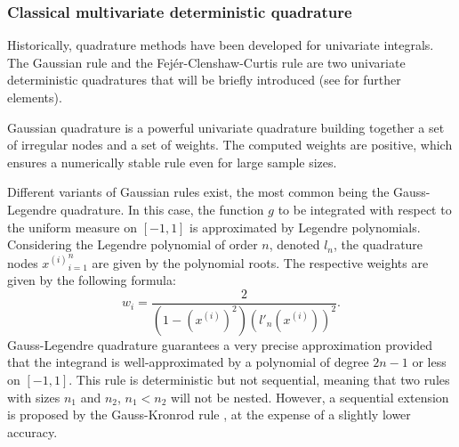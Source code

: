 \subsubsection{Classical multivariate deterministic quadrature}

Historically, quadrature methods have been developed for univariate integrals. 
The Gaussian rule and the Fejér-Clenshaw-Curtis rule are two univariate deterministic quadratures that will be briefly introduced (see \cite{sullivan_2015} for further elements). 

Gaussian quadrature is a powerful univariate quadrature building together a set of irregular nodes and a set of weights. 
The computed weights are positive, which ensures a numerically stable rule even for large sample sizes.

Different variants of Gaussian rules exist, the most common being the Gauss-Legendre quadrature. 
In this case, the function $g$ to be integrated with respect to the uniform measure on $[-1, 1]$ is approximated by Legendre polynomials. 
Considering the Legendre polynomial of order $n$, denoted $l_n$, the quadrature nodes ${x^{(i)}}_{i=1}^n$ are given by the polynomial roots. 
The respective weights are given by the following formula: 
\begin{equation}
    w_{i}={\frac {2}{\left(1-\left(x^{(i)}\right)^{2}\right)\left(l'_{n}(x^{(i)})\right)^{2}}}.
\end{equation}
Gauss-Legendre quadrature guarantees a very precise approximation provided that the integrand is well-approximated by a polynomial of degree $2n-1$ or less on $[-1, 1]$.
This rule is deterministic but not sequential, meaning that two rules with sizes $n_1$ and $n_2$, $n_1 < n_2$ will not be nested. 
However, a sequential extension is proposed by the Gauss-Kronrod rule \citep{laurie_1997}, at the expense of a slightly lower accuracy. 

